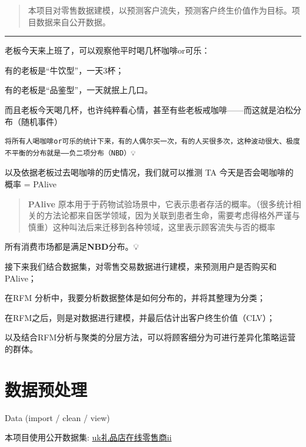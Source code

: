 \documentclass[
]{ctexart}
\begin{document}
\begin{quote}
本项目对零售数据建模，以预测客户流失，预测客户终生价值作为目标。项目数据来自公开数据。
\end{quote}

\begin{center}\rule{0.5\linewidth}{0.5pt}\end{center}

老板今天来上班了，可以观察他平时喝几杯咖啡or可乐：

有的老板是``牛饮型''，一天3杯；

有的老板是``品鉴型''，一天就抿上几口。

而且老板今天喝几杯，也许纯粹看心情，甚至有些老板戒咖啡------而这就是泊松分布（随机事件）

\begin{verbatim}
将所有人喝咖啡or可乐的统计下来，有的人偶尔买一次，有的人买很多次，这种波动很大、极度不平衡的分布就是——负二项分布（NBD）💡
\end{verbatim}

以及依据老板过去喝咖啡的历史情况，我们就可以推测 TA
今天是否会喝咖啡的概率 = PAlive

\begin{quote}
\textbf{PAlive}
原本用于于药物试验场景中，它表示患者存活的概率。（很多统计相关的方法论都来自医学领域，因为关联到患者生命，需要考虑得格外严谨与慎重）这种叫法后来迁移到各种领域，这里表示顾客流失与否的概率
\end{quote}

所有消费市场都是满足\textbf{NBD}分布。💡

接下来我们结合数据集，对零售交易数据进行建模，来预测用户是否购买和PAlive；

在RFM 分析中，我要分析数据整体是如何分布的，并将其整理为分类；

在RFM之后，则是对数据进行建模，并最后估计出客户终生价值（CLV）；

以及结合RFM分析与聚类的分层方法，可以将顾客细分为可进行差异化策略运营的群体。

\section{数据预处理}\label{ux6570ux636eux9884ux5904ux7406}

Data (import / clean / view)

本项目使用公开数据集:
\href{https://archive.ics.uci.edu/dataset/502/online+retail+ii}{uk礼品店在线零售商ii}
\end{document}
